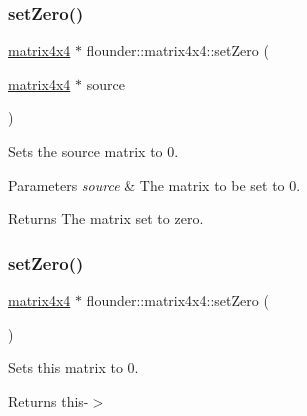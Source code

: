 \subsubsection{\texorpdfstring{set\+Zero()}{setZero()}\hspace{0.1cm}{\footnotesize\ttfamily [1/2]}}
{\footnotesize\ttfamily \hyperlink{classflounder_1_1matrix4x4}{matrix4x4} $\ast$ flounder\+::matrix4x4\+::set\+Zero (\begin{DoxyParamCaption}\item[{\hyperlink{classflounder_1_1matrix4x4}{matrix4x4} $\ast$}]{source }\end{DoxyParamCaption})\hspace{0.3cm}{\ttfamily [static]}}



Sets the source matrix to 0. 


\begin{DoxyParams}{Parameters}
{\em source} & The matrix to be set to 0. \\
\hline
\end{DoxyParams}
\begin{DoxyReturn}{Returns}
The matrix set to zero. 
\end{DoxyReturn}
\mbox{\label{classflounder_1_1matrix4x4_a3fd10ae3589d6ec447cc50f032cfc2f7}} 
\subsubsection{\texorpdfstring{set\+Zero()}{setZero()}\hspace{0.1cm}{\footnotesize\ttfamily [2/2]}}
{\footnotesize\ttfamily \hyperlink{classflounder_1_1matrix4x4}{matrix4x4} $\ast$ flounder\+::matrix4x4\+::set\+Zero (\begin{DoxyParamCaption}{ }\end{DoxyParamCaption})}



Sets this matrix to 0. 

\begin{DoxyReturn}{Returns}
this-\/$>$ 
\end{DoxyReturn}
\mbox{\label{classflounder_1_1matrix4x4_a1a5a10bb1c0e55f1fffc5559badc4e6b}} 
